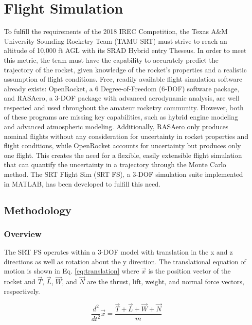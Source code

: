 \documentclass[10pt,a4paper]{article}
\begin{document}
	
\section{Flight Simulation}

To fulfill the requirements of the 2018 IREC Competition, the Texas A\&M University Sounding Rocketry Team (TAMU SRT) must strive to reach an altitude of 10,000 ft AGL with its SRAD Hybrid entry Theseus. In order to meet this metric, the team must have the capability to accurately predict the trajectory of the rocket, given knowledge of the rocket's properties and a realistic assumption of flight conditions. Free, readily available flight simulation software already exists: OpenRocket, a 6 Degree-of-Freedom (6-DOF) software package, and RASAero, a 3-DOF package with advanced aerodynamic analysis, are well respected and used throughout the amateur rocketry community. However, both of these programs are missing key capabilities, such as hybrid engine modeling and advanced atmospheric modeling. Additionally, RASAero only produces nominal flights without any consideration for uncertainty in rocket properties and flight conditions, while OpenRocket accounts for uncertainty but produces only one flight. This creates the need for a flexible, easily extensible flight simulation that can quantify the uncertainty in a trajectory through the Monte Carlo method. The SRT Flight Sim (SRT FS), a 3-DOF simulation suite implemented in MATLAB\textregistered, has been developed to fulfill this need.


\subsection{Methodology}

\subsubsection{Overview}

The SRT FS operates within a 3-DOF model with translation in the x and z directions as well as rotation about the y direction. The translational equation of motion is shown in Eq. \ref{eq:translation} where $\vec{x}$ is the position vector of the rocket and $\vec{T}$, $\vec{L}$, $\vec{W}$, and $\vec{N}$ are the thrust, lift, weight, and normal force vectors, respectively. 

\begin{equation}
\frac{d^2}{dt^2}\vec{x} = \frac{\vec{T}+\vec{L}+\vec{W}+\vec{N}}{m}
\label{eq:translation}
\end{equation}
\end{document}
